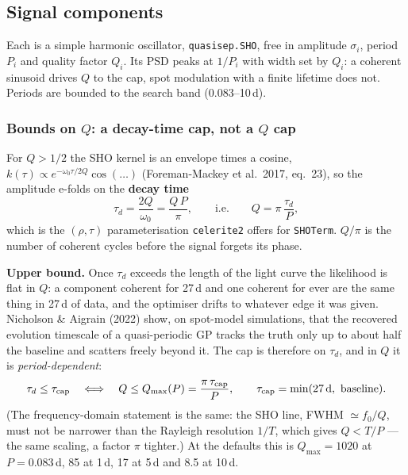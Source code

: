 \documentclass[11pt]{article}
\newcommand{\code}[1]{\texttt{#1}}
\begin{document}
\subsection{Signal components}

Each is a simple harmonic oscillator, \code{quasisep.SHO}, free in amplitude $\sigma_i$,
period $P_i$ and quality factor $Q_i$. Its PSD peaks at $1/P_i$ with width set by $Q_i$:
a coherent sinusoid drives $Q$ to the cap, spot modulation with a finite lifetime does not.
Periods are bounded to the search band (0.083--10\,d).

\subsubsection{Bounds on $Q$: a decay-time cap, not a $Q$ cap}
\label{sec:qbounds}

For $Q > 1/2$ the SHO kernel is an envelope times a cosine,
$k(\tau) \propto e^{-\omega_0 \tau / 2Q}\cos(\ldots)$ (Foreman-Mackey et al.\ 2017, eq.~23),
so the amplitude e-folds on the \textbf{decay time}
\begin{equation}
\tau_d = \frac{2Q}{\omega_0} = \frac{Q\,P}{\pi},
\qquad\text{i.e.}\qquad Q = \pi\,\frac{\tau_d}{P},
\end{equation}
which is the $(\rho, \tau)$ parameterisation \code{celerite2} offers for \code{SHOTerm}.
$Q/\pi$ is the number of coherent cycles before the signal forgets its phase.

\textbf{Upper bound.} Once $\tau_d$ exceeds the length of the light curve the likelihood is
flat in $Q$: a component coherent for 27\,d and one coherent for ever are the same thing in
27\,d of data, and the optimiser drifts to whatever edge it was given. Nicholson \& Aigrain
(2022) show, on spot-model simulations, that the recovered evolution timescale of a
quasi-periodic GP tracks the truth only up to about half the baseline and scatters freely
beyond it. The cap is therefore on $\tau_d$, and in $Q$ it is \emph{period-dependent}:
\begin{equation}
\tau_d \le \tau_{\rm cap}
\quad\Longleftrightarrow\quad
Q \le Q_{\max}(P) = \frac{\pi\,\tau_{\rm cap}}{P},
\qquad \tau_{\rm cap} = \min(27\,\mathrm{d},\ \text{baseline}).
\end{equation}
(The frequency-domain statement is the same: the SHO line, FWHM $\simeq f_0/Q$, must not be
narrower than the Rayleigh resolution $1/T$, which gives $Q < T/P$ --- the same scaling, a
factor $\pi$ tighter.) At the defaults this is $Q_{\max} = 1020$ at $P = 0.083$\,d, 85 at
1\,d, 17 at 5\,d and 8.5 at 10\,d.
\end{document}
